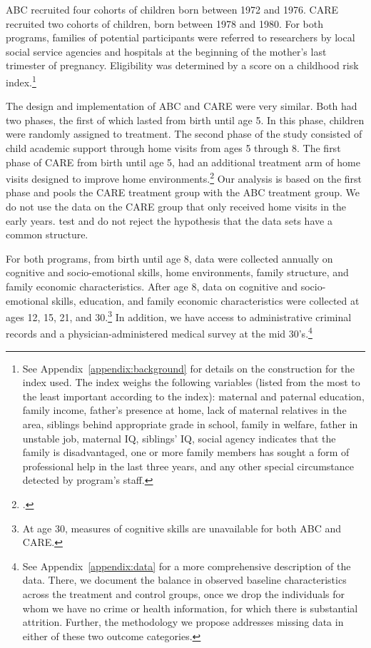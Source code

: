 ABC recruited four cohorts of children born between 1972 and 1976. CARE recruited two cohorts of children, born between 1978 and 1980. For both programs, families of potential participants were referred to researchers by local social service agencies and hospitals at the beginning of the mother's last trimester of pregnancy. Eligibility was determined by a score on a childhood risk index.\footnote{See  Appendix~\ref{appendix:background} for details on the construction for the index used. The index weighs the following variables (listed from the most to the least important according to the index): maternal and paternal education, family income, father's presence at home, lack of maternal relatives in the area, siblings behind appropriate grade in school, family in welfare, father in unstable job, maternal IQ, siblings' IQ, social agency indicates that the family is disadvantaged, one or more family members has sought a form of professional help in the last three years, and any other special circumstance detected by program's staff.} 

The design and implementation of ABC and CARE were very similar. Both had two phases, the first of which lasted from birth until age 5. In this phase, children were randomly assigned to treatment. The second phase of the study consisted of child academic support through home visits from ages 5 through 8. The first phase of CARE from birth until age 5, had an additional treatment arm of home visits designed to improve home environments.\footnote{\citet{Wasik_Ramey_etal_1990_CD}.} Our analysis is based on the first phase and pools the CARE treatment group with the ABC treatment group. We do not use the data on the CARE group that only received home visits in the early years. \cite{Campbell_Conti_etal_2014_EarlyChildhoodInvestments} test and do not reject the hypothesis that the data sets have a common structure.

For both programs, from birth until age 8, data were collected annually on cognitive and socio-emotional skills, home environments, family structure, and family economic characteristics. After age 8, data on cognitive and socio-emotional skills, education, and family economic characteristics were collected at ages 12, 15, 21, and 30.\footnote{At age 30, measures of cognitive skills are unavailable for both ABC and CARE.} In addition, we have access to administrative criminal records and a physician-administered medical survey at the mid 30's.\footnote{See  Appendix~\ref{appendix:data} for a more comprehensive description of the data. There, we document the balance in observed baseline characteristics across the treatment and control groups, once we drop the individuals for whom we have no crime or health information, for which there is substantial attrition. Further, the methodology we propose addresses missing data in either of these two outcome categories.}

